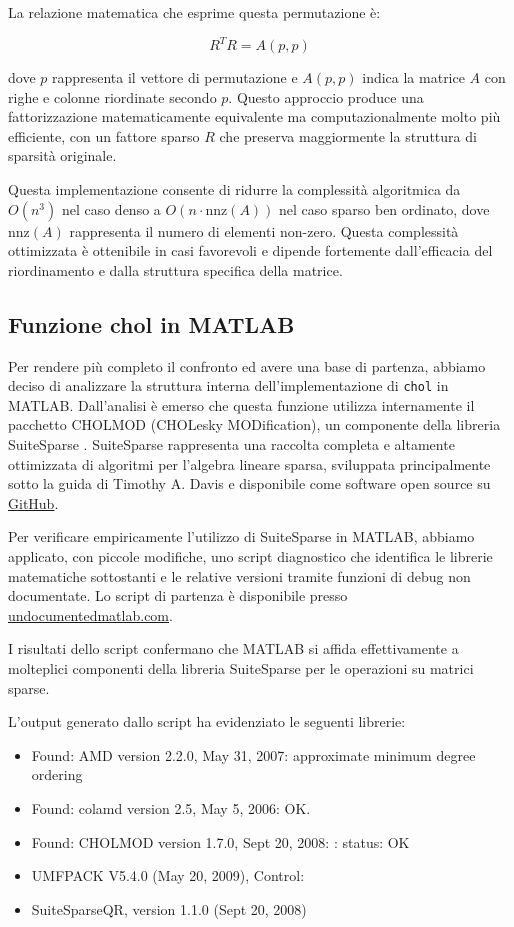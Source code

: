 La relazione matematica che esprime questa permutazione è:

\[ R^TR = A(p,p) \]

dove $p$ rappresenta il vettore di permutazione e $A(p,p)$ indica la matrice $A$ con righe e colonne riordinate secondo $p$. 
Questo approccio produce una fattorizzazione matematicamente equivalente ma computazionalmente molto più efficiente, 
con un fattore sparso $R$ che preserva maggiormente la struttura di sparsità originale.

Questa implementazione consente di ridurre la complessità algoritmica da $O(n^3)$ nel caso denso a $O(n \cdot \text{nnz}(A))$ 
nel caso sparso ben ordinato, dove $\text{nnz}(A)$ rappresenta il numero di elementi non-zero. Questa complessità ottimizzata 
è ottenibile in casi favorevoli e dipende fortemente dall'efficacia del riordinamento e dalla struttura specifica della matrice.

\subsection{Funzione chol in MATLAB}

Per rendere più completo il confronto ed avere una base di partenza, abbiamo deciso di analizzare 
la struttura interna dell'implementazione di \texttt{chol} in MATLAB. 
Dall'analisi è emerso che questa funzione utilizza internamente il pacchetto CHOLMOD (CHOLesky MODification), 
un componente della libreria SuiteSparse \cite{SuiteSparse}. SuiteSparse rappresenta una raccolta completa e 
altamente ottimizzata di algoritmi per l'algebra lineare sparsa, sviluppata principalmente sotto la guida 
di Timothy A. Davis e disponibile come software open source su \href{https://github.com/DrTimothyAldenDavis/SuiteSparse}{GitHub}.

Per verificare empiricamente l'utilizzo di SuiteSparse in MATLAB, abbiamo applicato, con piccole modifiche, uno script diagnostico 
che identifica le librerie matematiche sottostanti e le relative versioni tramite funzioni di debug non documentate.
Lo script di partenza è disponibile presso \href{https://undocumentedmatlab.com/articles/sparse-data-math-info}{undocumentedmatlab.com}.

I risultati dello script confermano che MATLAB si affida effettivamente a molteplici componenti della libreria SuiteSparse 
per le operazioni su matrici sparse.

L'output generato dallo script ha evidenziato le seguenti librerie:
\begin{itemize}
    \item Found: AMD version 2.2.0, May 31, 2007: approximate minimum degree ordering
    \item Found: colamd version 2.5, May 5, 2006: OK.
    \item Found: CHOLMOD version 1.7.0, Sept 20, 2008:  : status: OK
    \item UMFPACK V5.4.0 (May 20, 2009), Control:
    \item SuiteSparseQR, version 1.1.0 (Sept 20, 2008)
\end{itemize}

